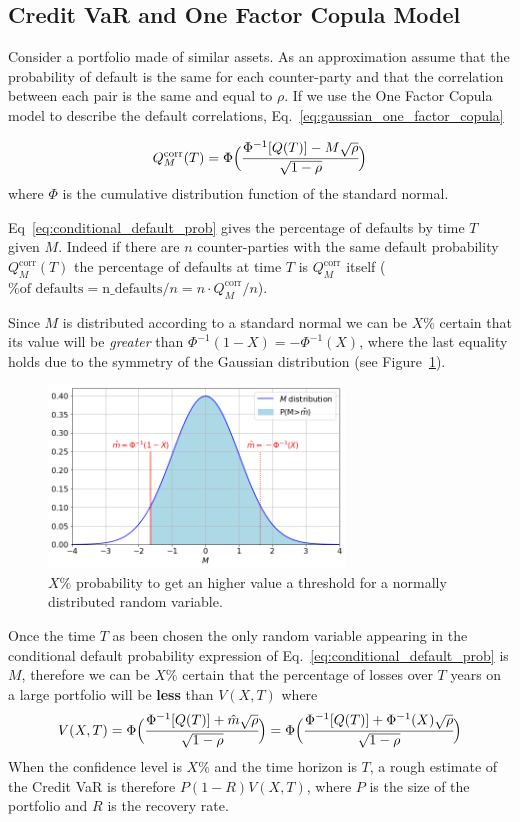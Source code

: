 \subsection{Credit VaR and One Factor Copula Model}
Consider a portfolio made of similar assets. As an approximation assume that the probability of default is the same for each counter-party and that the correlation between each pair is the same and equal to $\rho$. If we use the One Factor Copula model to describe the default correlations, Eq.~\ref{eq:gaussian_one_factor_copula}

\begin{equation}
Q^{\textrm{corr}}_M(T) = \Phi\Big(\cfrac{\Phi^{-1}[Q(T)]-M\sqrt{\rho}}{\sqrt{1-\rho}}\Big)
\label{eq:conditional_default_prob}
\end{equation}
where $\Phi$ is the cumulative distribution function of the standard normal.

Eq~\ref{eq:conditional_default_prob} gives the percentage of defaults by time $T$ given $M$. Indeed if there are $n$ counter-parties with the same default probability $Q^{\textrm{corr}}_M(T)$ the percentage of defaults at time $T$ is $Q^{\textrm{corr}}_M$ itself ($\textrm{\% of defaults} = \textrm{n\_defaults}/n = n\cdot Q^{\textrm{corr}}_M/n$).

Since $M$ is distributed according to a standard normal we can be $X\%$ certain that its value will be \emph{greater} than $\Phi^{-1}(1-X)=-\Phi^{-1}(X)$, where the last equality holds due to the symmetry of the Gaussian distribution (see Figure~\ref{fig:certain_for_X}).

\begin{figure}[htb]
	\centering
	\includegraphics[width=0.7\textwidth]{figures/certain_for_X}
	\caption{$X\%$ probability to get an higher value a threshold for a normally distributed random variable.}
	\label{fig:certain_for_X}
\end{figure} 

Once the time $T$ as been chosen the only random variable appearing in the conditional default probability expression of Eq.~\ref{eq:conditional_default_prob} is $M$, therefore we can be $X\%$ certain that the percentage of losses over $T$ years on a large portfolio will be \textbf{less} than $V(X,T)$ where
\[
V(X,T)= \Phi\Big(\cfrac{\Phi^{-1}[Q(T)]+\hat{m}\sqrt{\rho}}{\sqrt{1-\rho}}\Big) = \Phi\Big(\cfrac{\Phi^{-1}[Q(T)]+\Phi^{-1}(X)\sqrt{\rho}}{\sqrt{1-\rho}}\Big)
\]
When the confidence level is $X\%$ and the time horizon is $T$, a rough estimate of the Credit VaR is therefore $P(1-R)V(X,T)$, where $P$ is the size of the portfolio and $R$ is the recovery rate.

